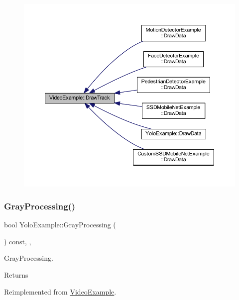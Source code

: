 \begin{figure}[H]
\begin{center}
\leavevmode
\includegraphics[width=350pt]{class_video_example_a84a040bc87b915c5ee18c5d11235f40c_icgraph}
\end{center}
\end{figure}
\mbox{\label{class_yolo_example_aec0d91a32770f9a351d635c30ae54826}} 
\subsubsection{\texorpdfstring{Gray\+Processing()}{GrayProcessing()}}
{\footnotesize\ttfamily bool Yolo\+Example\+::\+Gray\+Processing (\begin{DoxyParamCaption}{ }\end{DoxyParamCaption}) const\hspace{0.3cm}{\ttfamily [inline]}, {\ttfamily [protected]}, {\ttfamily [virtual]}}



Gray\+Processing. 

\begin{DoxyReturn}{Returns}

\end{DoxyReturn}


Reimplemented from \mbox{\hyperlink{class_video_example_af8ea44f17711129d2b954d1f01fee1f0}{Video\+Example}}.



